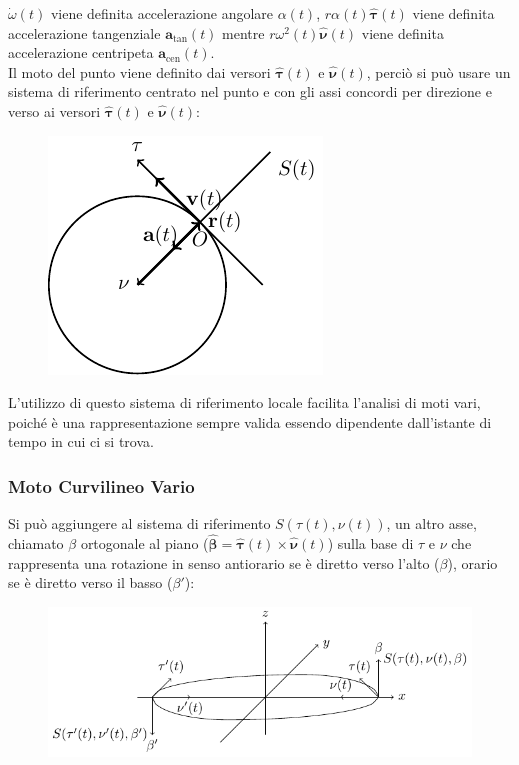 \documentclass{article}
\newcommand{\vect}[1]{\boldsymbol{\mathbf{#1}}}
\numberwithin{equation}{subsection}
\begin{document}
$\dot\omega(t)$ viene definita accelerazione angolare $\alpha(t)$, 
$r\alpha(t)\hat{\vect{\tau}}(t)$ viene definita accelerazione tangenziale 
$\vect{a}_\mathrm{tan}(t)$ mentre $r\omega^{2}(t)\hat{\vect{\nu}}(t)$ viene definita 
accelerazione centripeta $\vect{a}_\mathrm{cen}(t)$.
\\
Il moto del punto viene definito dai versori $\hat{\vect{\tau}}(t)$ e $\hat{\vect{\nu}}(t)$, 
perciò si può usare un sistema di riferimento centrato nel punto e con gli assi 
concordi per direzione e verso ai versori $\hat{\vect{\tau}}(t)$ e $\hat{\vect{\nu}}(t)$:

\begin{figure}[H]%
    \centering
    \includegraphics{moto-circolare.pdf}%
\end{figure}

L'utilizzo di questo sistema di riferimento locale facilita 
l'analisi di moti vari, poiché è una rappresentazione sempre 
valida essendo dipendente dall'istante di tempo in cui ci 
si trova.

\subsubsection{Moto Curvilineo Vario}
Si può aggiungere al sistema di riferimento $S(\tau(t), \nu(t))$, un altro 
asse, chiamato $\beta$ ortogonale al piano ($\hat{\vect{\beta}}=\hat{\vect{\tau}}(t)\times\hat{\vect{\nu}}(t)$) sulla base di $\tau$ e $\nu$ 
che rappresenta una rotazione in senso antiorario se è diretto 
verso l'alto ($\beta$), orario se è diretto verso il basso ($\beta'$):

\begin{figure}[H]%
    \centering
    \includegraphics{moto-curvilineo-1.pdf}%
\end{figure}
\end{document}
